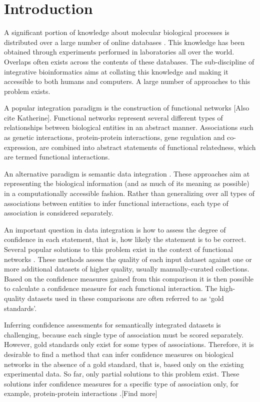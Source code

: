 \documentclass{bioinfo}
\newcommand{\note}[1]{{\color{red}[#1]}}
\begin{document}
\section{Introduction} 

A significant portion of knowledge about molecular biological processes is distributed over a large number of online databases \citep{stein_creating_2002}. This knowledge has been obtained through experiments performed in laboratories all over the world. Overlaps often exists across the contents of these databases. The sub-discipline of integrative bioinformatics aims at collating this knowledge and making it accessible to both humans and computers. A large number of approaches to this problem exists. %

A popular integration paradigm is the construction of functional networks \citep{von_mering_string:_2003,warde-farley_genemania_2010}\note{Also cite Katherine}. Functional networks represent several different types of relationships between biological entities in an abstract manner. Associations such as genetic interactions, protein-protein interactions, gene regulation and co-expression, are combined into abstract statements of functional relatedness, which are termed functional interactions.

An alternative paradigm is semantic data integration \citep{cheung_yeasthub:_2005,smith_obo_2007,koehler_graph-based_2006}. These approaches aim at representing the biological information (and as much of its meaning as possible) in a computationally accessible fashion. Rather than generalizing over all types of associations between entities to infer functional interactions, each type of association is considered separately.

An important question in data integration is how to assess the degree of confidence in each statement, that is, how likely the statement is to be correct. Several popular solutions to this problem exist in the context of functional networks \citep{lee_probabilistic_2004,troyanskaya_bayesian_2003}.
These methods assess the quality of each input dataset against one or more additional datasets of higher quality, usually manually-curated collections. Based on the confidence measures gained from this comparison it is then possible to calculate a confidence measure for each functional interaction. The high-quality datasets used in these comparisons are often referred to as `gold standards'. 

Inferring confidence assessments for semantically integrated datasets is challenging, because each single type of association must be scored separately. However, gold standards only exist for some types of associations. Therefore, it is desirable to find a method that can infer confidence measures on biological networks in the absence of a gold standard, that is, based only on the existing experimental data. So far, only partial solutions to this problem exist. These solutions infer confidence measures for a specific type of association only, for example, protein-protein interactions \citep{bader_gaining_2004}.\note{Find more}
\end{document}
